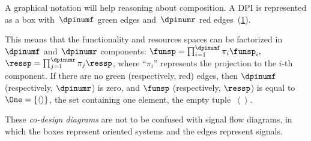 \begin{center}
\end{center}


A graphical notation will help reasoning about composition. A DPI is represented as a box with~$\dpinumf$ green edges and~$\dpinumr$ red edges~(\cref{fig:dp_graphical}).

\begin{figure}[h]
    \centering
    \caption{\label{fig:dp_graphical}}
\end{figure}


This means that the functionality and resources spaces can be factorized in~$\dpinumf$ and~$\dpinumr$ components: $\funsp=\prod_{i=1}^{\dpinumf}\pi_{i}\funsp_{i},$
$\ressp=\prod_{j=1}^{\dpinumr}\pi_{j}\ressp$, where ``$\pi_{i}$''
represents the projection to the $i$-th component. If there are no
green (respectively, red) edges, then $\dpinumf$ (respectively, $\dpinumr$)
is zero, and $\funsp$ (respectively, $\ressp$) is equal to~$\One=\{\left\langle \right\rangle \}$,
the set containing one element, the empty tuple~$\left\langle \right\rangle $.

These \emph{co-design diagrams} are not to be confused with signal
flow diagrams, in which the boxes represent oriented systems and the
edges represent signals.


